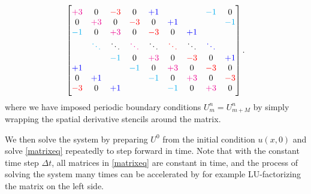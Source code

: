 \begin{equation*}
\begin{bmatrix}
\color{magenta} +3      & 0           & \color{red} -3      & 0           & \color{blue} +1      &             &             & \color{cyan} -1      & 0           \\
0           & \color{magenta} +3      & 0           & \color{red} -3      & 0           & \color{blue} +1      &             &             & \color{cyan} -1      \\
\color{cyan} -1      & 0           & \color{magenta} +3      & 0           & \color{red} -3      & 0           & \color{blue} +1      &             &             \\
            & \color{cyan} \ddots  & \ddots      & \color{magenta} \ddots  & \ddots      & \color{red} \ddots  & \ddots      & \color{blue} \ddots  &             \\
            &             & \color{cyan} -1      & 0           & \color{magenta} +3      & 0           & \color{red} -3      & 0           & \color{blue} +1      \\
\color{blue} +1      &             &             & \color{cyan} -1      & 0           & \color{magenta} +3      & 0           & \color{red} -3      & 0           \\
0           & \color{blue} +1      &             &             & \color{cyan} -1      & 0           & \color{magenta} +3      & 0           & \color{red} -3      \\
\color{red} -3      & 0           & \color{blue} +1      &             &             & \color{cyan} -1      & 0           & \color{magenta} +3      & 0           \\
\end{bmatrix}
.
\end{equation*}
where we have imposed periodic boundary conditions $U_m^n = U_{m+M}^n$ by simply wrapping the spatial derivative stencils around the matrix.

We then solve the system by preparing $U^0$ from the initial condition $u(x, 0)$ and solve \cref{matrixeq} repeatedly to step forward in time.
Note that with the constant time step $\Delta t$, all matrices in \cref{matrixeq} are constant in time, and the process of solving the system many times can be accelerated by for example LU-factorizing the matrix on the left side.

